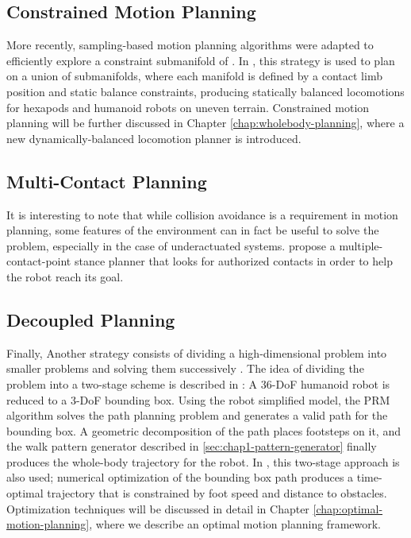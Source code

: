 \subsection{Constrained Motion Planning}
\label{subsec:chap1-constrained-motion-planning}

More recently, sampling-based motion planning algorithms were adapted
to efficiently explore a constraint submanifold of \cspace. In
\cite{bret06, haus10}, this strategy is used to plan on a union of
submanifolds, where each manifold is defined by a contact limb
position and static balance constraints, producing statically balanced
locomotions for hexapods and humanoid robots on uneven
terrain. Constrained motion planning will be further discussed in
Chapter \ref{chap:wholebody-planning}, where a new dynamically-balanced locomotion
planner is introduced.

\subsection{Multi-Contact Planning}
\label{subsec-chap1-multi-contact-planning}

It is interesting to note that while collision avoidance is a
requirement in motion planning, some features of the environment can
in fact be useful to solve the problem, especially in the case of
underactuated systems. \cite{esca06, bouy12} propose a
multiple-contact-point stance planner that looks for authorized
contacts in order to help the robot reach its goal.

\subsection{Decoupled Planning}
\label{subsec:chap1-bounding-box}

Finally, Another strategy consists of dividing a high-dimensional
problem into smaller problems and solving them successively
\cite{zhan09}. The idea of dividing the problem into a two-stage
scheme is described in \cite{yosh08}: A 36-DoF humanoid robot is
reduced to a 3-DoF bounding box. Using the robot simplified model, the
PRM algorithm solves the path planning problem and generates a valid
path for the bounding box. A geometric decomposition of the path
places footsteps on it, and the walk pattern generator described in
\ref{sec:chap1-pattern-generator} finally produces the whole-body
trajectory for the robot. In \cite{moul10}, this two-stage approach is
also used; numerical optimization of the bounding box path produces a
time-optimal trajectory that is constrained by foot speed and distance
to obstacles. Optimization techniques will be discussed in detail in
Chapter \ref{chap:optimal-motion-planning}, where we describe an
optimal motion planning framework.

